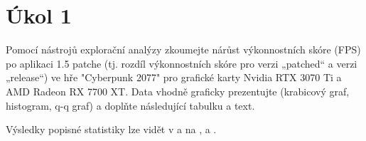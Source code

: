 \section*{Úkol 1}
\label{sec:task-1}

Pomocí nástrojů explorační analýzy zkoumejte nárůst výkonnostních skóre (FPS) po aplikaci 1.5 patche 
(tj. rozdíl výkonnostních skóre pro verzi „patched“ a verzi „release“) ve hře "Cyberpunk 2077" pro grafické karty 
Nvidia RTX 3070 Ti a AMD Radeon RX 7700 XT. Data vhodně graficky prezentujte (krabicový graf, histogram, q-q graf) 
a doplňte následující tabulku a text.

\vspace{2em}
\noindent
Výsledky popisné statistiky lze vidět v  a na  ,  a .

\newcommand{\rangeValues}       {70,        59,         69,         58}
\newcommand{\minValues}         {-4.8,      4.2,        5.1,        4.2}
\newcommand{\QfValues}          {5.425,     4.900,      5.500,      4.900}
\newcommand{\medianValues}      {5.700,     5.300,      5.700,      5.300}
\newcommand{\meanValues}        {5.600,     5.371,      5.750,      5.191}
\newcommand{\QtValues}          {6.100,     5.550,      6.100,      5.500}
\newcommand{\maxValues}         {6.6,       15.8,       6.6,        5.9}
\newcommand{\sdValues}          {1.335,     1.452,      0.439,      0.451}
\newcommand{\cvValues}          {23.8,      27.0,       7.6,        8.7}
\newcommand{\skewnessValues}    {-6.9,      6.4,        0.2,        -0.4}
\newcommand{\kurtosisValues}    {51.3,      43.8,       -1.0,       -0.7}
\newcommand{\lowerBoundValues}  {4.41,      3.92,       0,          0}
\newcommand{\upperBoundValues}  {7.11,      6.52,       0,          0}

\newcommand{\sigmaValues} {4.873, 6.628, 4.289, 6.093}

\newcommand{\tableValue}[2]{%
    \pgfmathparse{{#1}[#2]}%
    \mbox{\pgfmathresult}%
}

